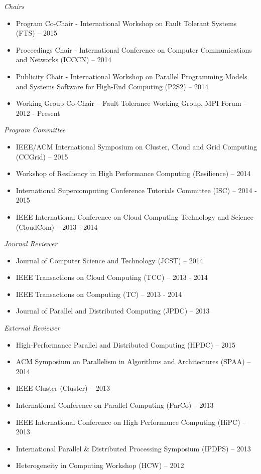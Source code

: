 {\sl Chairs}
\begin{itemize}
    \item Program Co-Chair - International Workshop on Fault Tolerant Systems
        (FTS) -- 2015
    \item Proceedings Chair - International Conference on Computer
        Communications and Networks (ICCCN) -- 2014
    \item Publicity Chair - International Workshop on Parallel Programming
        Models and Systems Software for High-End Computing (P2S2) -- 2014
    \item Working Group Co-Chair -- Fault Tolerance Working Group, MPI Forum -- 2012 - Present
\end{itemize}

{\sl Program Committee}
\begin{itemize}
    \item IEEE/ACM International Symposium on Cluster, Cloud and Grid
        Computing (CCGrid) -- 2015
    \item Workshop of Resiliency in High Performance Computing (Resilience) --
        2014
    \item International Supercomputing Conference Tutorials Committee (ISC) --
        2014 - 2015
    \item IEEE International Conference on Cloud Computing Technology and
        Science (CloudCom) -- 2013 - 2014
\end{itemize}

{\sl Journal Reviewer}
\begin{itemize}
    \item Journal of Computer Science and Technology (JCST) -- 2014
    \item IEEE Transactions on Cloud Computing (TCC) -- 2013 - 2014
    \item IEEE Transactions on Computing (TC) -- 2013 - 2014
    \item Journal of Parallel and Distributed Computing (JPDC) -- 2013
\end{itemize}

{\sl External Reviewer}
\begin{itemize}
    \item High-Performance Parallel and Distributed Computing (HPDC) -- 2015
    \item ACM Symposium on Parallelism in Algorithms and Architectures (SPAA) -- 2014
    \item IEEE Cluster (Cluster) -- 2013
    \item International Conference on Parallel Computing (ParCo) -- 2013
    \item IEEE International Conference on High Performance Computing (HiPC) -- 2013
    \item International Parallel \& Distributed Processing Symposium (IPDPS) -- 2013
    \item Heterogeneity in Computing Workshop (HCW) -- 2012
\end{itemize}


